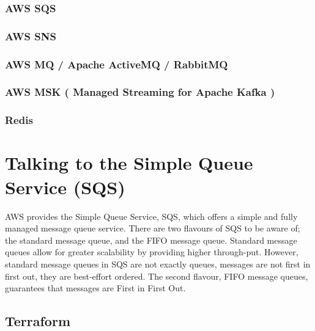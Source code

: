 \documentclass{csse4400}
\begin{document}
\subsubsection{AWS SQS}

\subsubsection{AWS SNS}

\subsubsection{AWS MQ / Apache ActiveMQ / RabbitMQ}


\subsubsection{AWS MSK ( Managed Streaming for Apache Kafka )}


\subsubsection{Redis}


\section{Talking to the Simple Queue Service (SQS)}

AWS provides the Simple Queue Service, SQS,
which offers a simple and fully managed message queue service.
There are two flavours of SQS to be aware of;
the standard message queue, and the FIFO message queue.
Standard message queues allow for greater scalability by providing higher through-put.
However, standard message queues in SQS are not exactly queues,
messages are not first in first out,
they are best-effort ordered.
The second flavour, FIFO message queues,
guarantees that messages are First in First Out.

\subsection{Terraform}

\end{document}
